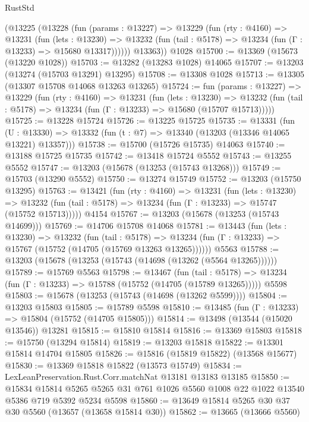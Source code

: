 \begin{lexlean}{RustStd}
\begin{coremodule}
      (@13225
        (@13228
          (fun (params : @13227) =>
          @13229
            (fun (rty : @4160) =>
            @13231
              (fun (lets : @13230) =>
              @13232 (fun (tail : @5178) => @13234 (fun (Γ : @13233) => @15680 @13317))))))
        @13363))
    @1028
@15700 := @13369 (@15673 (@13220 @1028))
@15703 := @13282 (@13283 @1028) @14065
@15707 := @13203 (@13274 (@15703 @13291) @13295)
@15708 := @13308 @1028
@15713 := @13305 (@13307 @15708 @14068 @13263 @13265)
@15724 := fun (params : @13227) =>
  @13229
    (fun (rty : @4160) =>
    @13231
      (fun (lets : @13230) =>
      @13232 (fun (tail : @5178) => @13234 (fun (Γ : @13233) => @15680 (@15707 @15713)))))
@15725 := @13228 @15724
@15726 := @13225 @15725
@15735 := @13331
    (fun (U : @13330) => @13332 (fun (t : @7) => @13340 (@13203 (@13346 @14065 @13221) @13357)))
@15738 := @15700 (@15726 @15735) @14063
@15740 := @13188 @15725 @15735
@15742 := @13418 @15724 @5552
@15743 := @13255 @5552
@15747 := @13203 (@15678 (@13253 (@15743 @13268)))
@15749 := @15703 (@13290 @5552)
@15750 := @13274 @15749
@15752 := @13203 (@15750 @13295)
@15763 := @13421
    (fun (rty : @4160) =>
    @13231
      (fun (lets : @13230) =>
      @13232 (fun (tail : @5178) => @13234 (fun (Γ : @13233) => @15747 (@15752 @15713)))))
    @4154
@15767 := @13203 (@15678 (@13253 (@15743 @14699)))
@15769 := @14706 @15708 @14068
@15781 := @13443
    (fun (lets : @13230) =>
    @13232
      (fun (tail : @5178) =>
      @13234 (fun (Γ : @13233) => @15767 (@15752 (@14705 (@15769 @13263 @13265))))))
    @5563
@15788 := @13203 (@15678 (@13253 (@15743 (@14698 (@13262 (@5564 @13265))))))
@15789 := @15769 @5563
@15798 := @13467
    (fun (tail : @5178) => @13234 (fun (Γ : @13233) => @15788 (@15752 (@14705 (@15789 @13265)))))
    @5598
@15803 := @15678 (@13253 (@15743 (@14698 (@13262 @5599))))
@15804 := @13203 @15803
@15805 := @15789 @5598
@15810 := @13485 (fun (Γ : @13233) => @15804 (@15752 (@14705 @15805)))
@15814 := @13498 (@13544 (@15020 @13546)) @13281
@15815 := @15810 @15814
@15816 := @13369 @15803
@15818 := @15750 (@13294 @15814)
@15819 := @13203 @15818
@15822 := @13301 @15814 @14704 @15805
@15826 := @15816 (@15819 @15822) (@13568 @15677)
@15830 := @13369 @15818 @15822 (@13573 @15749)
@15834 := LexLeanPreservation.Rust.Corr.matchNat @13181 @13183 @13185
@15850 := @15834
    @15814
    @5265
    @5265
    @31
    @761
    @1026
    @5560
    @1008
    @22
    @1022
    @13540
    @5386
    @719
    @5392
    @5234
    @5598
@15860 := @13649 @15814 @5265 @30 @37 @30 @5560 (@13657 (@13658 @15814 @30))
@15862 := @13665 (@13666 @5560)

\end{coremodule}
\end{lexlean}
